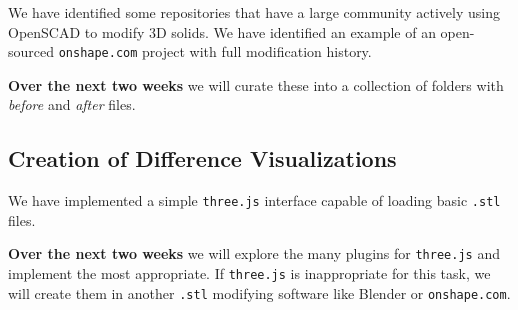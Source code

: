 \documentclass[sigconf,authorversion,nonacm]{acmart}
\begin{document}
We have identified some repositories that have a large community actively using OpenSCAD to modify 3D solids. We have identified an example of an open-sourced \texttt{onshape.com} project with full modification history.

\textbf{Over the next two weeks} we will curate these into a collection of folders with \emph{before} and \emph{after} files.

\subsection{Creation of Difference Visualizations}

We have implemented a simple \texttt{three.js} interface capable of loading basic \texttt{.stl} files.

\textbf{Over the next two weeks} we will explore the many plugins for \texttt{three.js} and implement the most appropriate. If \texttt{three.js} is inappropriate for this task, we will create them in another \texttt{.stl} modifying software like Blender or \texttt{onshape.com}.


\end{document}
